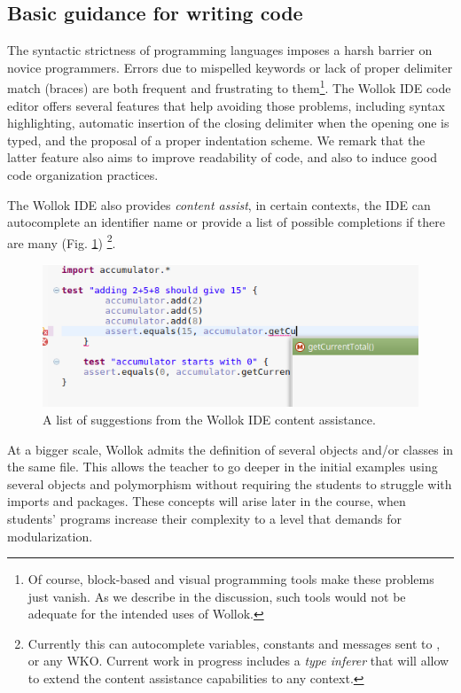 \subsection{Basic guidance for writing code}
The syntactic strictness of programming languages imposes a harsh barrier on novice programmers. 
Errors due to mispelled keywords or lack of proper delimiter match (\eg braces) are both frequent and frustrating to them\footnote{Of course, block-based and visual programming tools make these problems just vanish. As we describe in the discussion, such tools would not be adequate for the intended uses of Wollok.}.
The Wollok IDE code editor offers several features that help avoiding those problems, 
including syntax highlighting, automatic insertion of the closing delimiter when the opening one is typed, and the proposal of a proper indentation scheme. 
We remark that the latter feature also aims to improve readability of code, and also to induce good code organization practices.

The Wollok IDE also provides \emph{content assist}, 
\ie in certain contexts, the IDE can autocomplete an identifier name or provide a list of possible completions if there are many (\cf Fig. \ref{fig:codeCompletion})%
\footnote{Currently this can autocomplete variables, constants and messages sent to ,  or any WKO. 
Current work in progress includes a \emph{type inferer} that will allow to extend the content assistance capabilities to any context.}. 
 
\begin{figure}[ht]
\vspace{-2mm}
\centering
\includegraphics[scale=0.40]{images/codeCompletion.png}
\vspace{-2mm}
\caption{\small A list of suggestions from the Wollok IDE content assistance.}
\label{fig:codeCompletion}
\vspace{-2mm}
\end{figure}

At a bigger scale, Wollok admits the definition of several objects and/or classes in the same file. 
This allows the teacher to go deeper in the initial examples using several objects and polymorphism without requiring the students to struggle with imports and packages.
These concepts will arise later in the course, when students' programs increase their complexity to a level that demands for modularization. 


